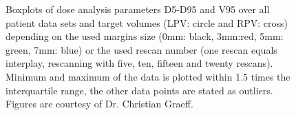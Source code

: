 \begin{figure}[H]
{}
\caption{Boxplots of dose analysis parameters D5-D95 and V95 over all patient data sets and target volumes (LPV: circle and 
RPV: cross) depending on the used margins size (0mm: black, 3mm:red, 5mm: green, 7mm: blue) or the used rescan number (one rescan equals 
interplay, rescanning with five, ten, fifteen and twenty rescans). Minimum and maximum of the data is plotted within 1.5 times the
interquartile range, the other data points are stated as outliers. Figures are courtesy of Dr. Christian Graeff.}
\label{static_interplay_rescanning_ALLpatients_KORR}
\end{figure}

\newpage

